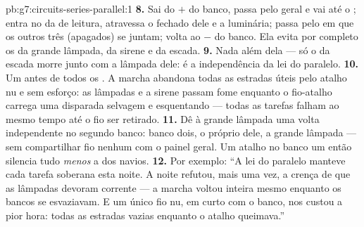 \begin{solution}{pb:g7:circuits-series-parallel:1}
\textbf{8.} Sai do $+$ do banco, passa pelo  geral e vai
até o ; entra no  da  de leitura, atravessa o 
fechado dele e a luminária; passa pelo  em que os outros três 
(apagados) se juntam; volta ao $-$ do banco. Ela evita por completo
os  da grande lâmpada, da sirene e da escada.
\textbf{9.} Nada além dela --- só o  da escada morre junto com a
lâmpada dele: é a independência da lei do paralelo.
\textbf{10.} Um  antes de todos os . A marcha
abandona todas as estradas úteis pelo atalho nu e sem esforço: as
lâmpadas e a sirene passam fome enquanto o fio-atalho carrega uma
disparada selvagem e esquentando --- todas as tarefas falham ao mesmo
tempo até o fio ser retirado.
\textbf{11.} Dê à grande lâmpada uma volta independente no segundo
banco: banco dois, o  próprio dele, a grande lâmpada ---
sem compartilhar fio nenhum com o painel geral. Um atalho no banco um
então silencia tudo \emph{menos} a  dos navios.
\textbf{12.} Por exemplo: ``A lei do paralelo manteve cada tarefa
soberana esta noite. A noite refutou, mais uma vez, a crença de que
as lâmpadas devoram corrente --- a marcha voltou inteira mesmo
enquanto os bancos se esvaziavam. E um único fio nu, em curto com o
banco, nos custou a pior hora: todas as estradas vazias enquanto o
atalho queimava.''
\end{solution}
